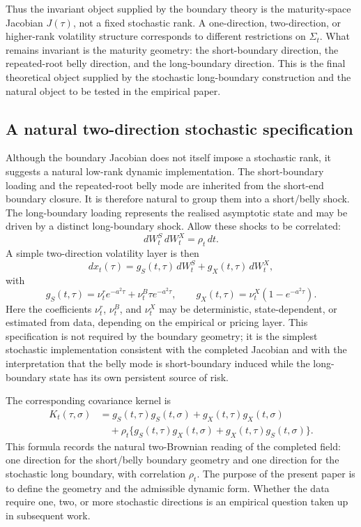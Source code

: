 \documentclass[11pt]{article}
\begin{document}
Thus the invariant object supplied by the boundary theory is the maturity-space Jacobian \(J(\tau)\), not a fixed stochastic rank. A one-direction, two-direction, or higher-rank volatility structure corresponds to different restrictions on \(\Sigma_t\). What remains invariant is the maturity geometry: the short-boundary direction, the repeated-root belly direction, and the long-boundary direction. This is the final theoretical object supplied by the stochastic long-boundary construction and the natural object to be tested in the empirical paper.

\subsection{A natural two-direction stochastic specification}

Although the boundary Jacobian does not itself impose a stochastic rank, it suggests a natural low-rank dynamic implementation. The short-boundary loading and the repeated-root belly mode are inherited from the short-end boundary closure. It is therefore natural to group them into a short/belly shock. The long-boundary loading represents the realised asymptotic state and may be driven by a distinct long-boundary shock. Allow these shocks to be correlated:
\[
dW^S_t\,dW^X_t=\rho_t\,dt.
\]
A simple two-direction volatility layer is then
\[
dx_t(\tau)
=
g_S(t,\tau)\,dW^S_t
+
g_X(t,\tau)\,dW^X_t,
\]
with
\[
g_S(t,\tau)
=
\nu^r_t e^{-a^2\tau}
+
\nu^B_t\tau e^{-a^2\tau},
\qquad
g_X(t,\tau)
=
\nu^X_t\left(1-e^{-a^2\tau}\right).
\]
Here the coefficients \(\nu^r_t\), \(\nu^B_t\), and \(\nu^X_t\) may be deterministic, state-dependent, or estimated from data, depending on the empirical or pricing layer. This specification is not required by the boundary geometry; it is the simplest stochastic implementation consistent with the completed Jacobian and with the interpretation that the belly mode is short-boundary induced while the long-boundary state has its own persistent source of risk.

The corresponding covariance kernel is
\[
\begin{aligned}
K_t(\tau,\sigma)
&=
g_S(t,\tau)g_S(t,\sigma)
+
g_X(t,\tau)g_X(t,\sigma) \\
&\quad+
\rho_t\{g_S(t,\tau)g_X(t,\sigma)+g_X(t,\tau)g_S(t,\sigma)\}.
\end{aligned}
\]
This formula records the natural two-Brownian reading of the completed field: one direction for the short/belly boundary geometry and one direction for the stochastic long boundary, with correlation \(\rho_t\). The purpose of the present paper is to define the geometry and the admissible dynamic form. Whether the data require one, two, or more stochastic directions is an empirical question taken up in subsequent work.
\end{document}
